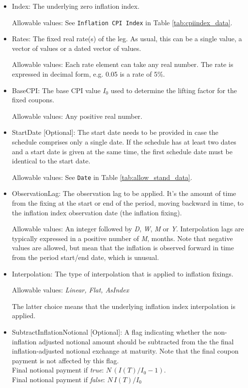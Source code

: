 \begin{itemize}
\item Index: The underlying zero inflation index.

Allowable values:  See \lstinline!Inflation CPI Index! in Table \ref{tab:cpiindex_data}.
\item Rates: The fixed real rate(s) of the leg. As usual, this can be a single value, a vector of values or a dated vector of
  values.
 
 Allowable values: Each rate element can take any  real number. The rate is
  expressed in decimal form, e.g. 0.05 is a rate of 5\%.
\item BaseCPI: The base CPI value $I_0$ used to determine the lifting factor for the fixed coupons.

Allowable values:  Any positive real number.

\item StartDate [Optional]: The start date needs to be provided in case the schedule comprises only a single date. If
  the schedule has at least two dates and a start date is given at the same time, the first schedule date must be
  identical to the start date.
  
Allowable values:  See \lstinline!Date! in Table \ref{tab:allow_stand_data}. 

\item ObservationLag: The observation lag to be applied. It's the amount of time from the fixing at the start or end of the period, moving backward in time, to the inflation index observation date (the inflation fixing). 

Allowable values: An integer followed by \emph{D}, \emph{W}, \emph{M} or \emph{Y}. Interpolation lags are typically expressed in a positive number of  \emph{M}, months. Note that negative values are allowed, but mean that the inflation is observed forward in time from the period start/end date, which is unusual.  

\item Interpolation: The type of interpolation that is applied to inflation fixings.

Allowable values:  \emph{Linear, Flat, AsIndex} 

\medskip
The latter choice means that the underlying inflation index
interpolation is applied.

\item SubtractInflationNotional [Optional]: A flag indicating whether
  the non-inflation adjusted notional amount should be subtracted from
  the the final inflation-adjusted notional exchange at maturity.
  Note that the final coupon payment is not affected by this flag. \\ 
Final notional payment if \emph{true}: $N \,(I(T)/I_0-1)$. \\ 
Final notional payment if  \emph{false}: $N \,I(T)/I_0$ 


\end{itemize}
